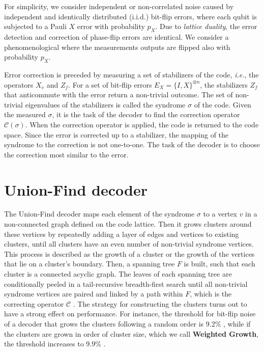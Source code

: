 For simplicity, we consider independent or non-correlated noise caused by independent and identically distributed (i.i.d.) bit-flip errors, where each qubit is subjected to a Pauli $X$ error with probability $p_X$. Due to \emph{lattice duality}, the error detection and correction of phase-flip errors are identical. We consider a phenomenological where the measurements outputs are flipped also with probability $p_X$. 

Error correction is preceded by measuring a set of stabilizers of the code, \emph{i.e.}, the operators $X_v$ and $Z_f$. For a set of bit-flip errors $E_X = \{I,X\}^{\otimes n}$, the stabilizers $Z_f$ that anticommute with the error return a non-trivial outcome. The set of non-trivial eigenvalues of the stabilizers is called the syndrome $\sigma$ of the code. Given the measured $\sigma$, it is the task of the decoder to find the correction operator $\mathcal{C}(\sigma)$. When the correction operator is applied, the code is returned to the code space. Since the error is corrected up to a stabilizer, the mapping of the syndrome to the correction is not one-to-one. The task of the decoder is to choose the correction most similar to the error. 

\section{Union-Find decoder}\label{sec:unionfind}

The Union-Find decoder \cite{delfosse2017almost} maps each element of the syndrome $\sigma$ to a vertex $v$ in a non-connected graph defined on the code lattice. Then it grows clusters around these vertices by repeatedly adding a layer of edges and vertices to existing clusters, until all clusters have an even number of non-trivial syndrome vertices. This process is described as the growth of a cluster or the growth of the vertices that lie on a cluster's boundary. Then, a spanning tree $F$ is built, such that each cluster is a connected acyclic graph. The leaves of each spanning tree are conditionally peeled in a tail-recursive breadth-first search until all non-trivial syndrome vertices are paired and linked by a path within $F$, which is the correcting operator $\mathcal{C}$ \cite{delfosse2017linear}. The strategy for constructing the clusters turns out to have a strong effect on performance. For instance, the threshold for bit-flip noise of a decoder that grows the clusters following a random order is $9.2\%$ \cite{delf}, while if the clusters are grown in order of cluster size, which we call \textbf{Weighted Growth}, the threshold increases to $9.9\%$ \cite{delf}. %

